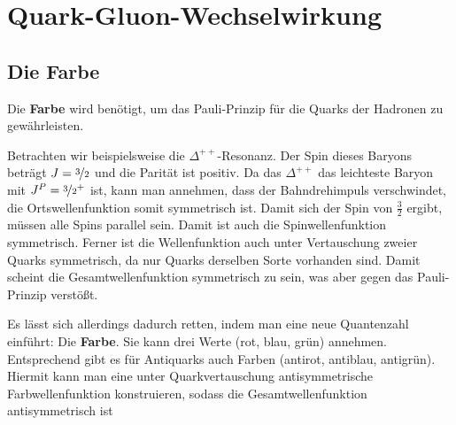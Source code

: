 \section{Quark-Gluon-Wechselwirkung}
\subsection{Die Farbe}
Die \textbf{Farbe} wird benötigt, um das Pauli-Prinzip für die Quarks der Hadronen zu gewährleisten.

Betrachten wir beispielsweise die $\Delta^{++}$-Resonanz.
Der Spin dieses Baryons beträgt $J=\nicefrac{3}{2}$ und die Parität ist positiv.
Da das $\Delta^{++}$ das leichteste Baryon mit $J^P=\nicefrac{3}{2}^+$ ist, kann man annehmen, dass der Bahndrehimpuls verschwindet, die Ortswellenfunktion somit symmetrisch ist.
Damit sich der Spin von $\tfrac{3}{2}$ ergibt, müssen alle Spins parallel sein.
Damit ist auch die Spinwellenfunktion symmetrisch.
Ferner ist die Wellenfunktion auch unter Vertauschung zweier Quarks symmetrisch, da nur Quarks derselben Sorte vorhanden sind.
Damit scheint die Gesamtwellenfunktion symmetrisch zu sein, was aber gegen das Pauli-Prinzip verstößt.

Es lässt sich allerdings dadurch retten, indem man eine neue Quantenzahl einführt: Die \textbf{Farbe}.
Sie kann drei Werte (rot, blau, grün) annehmen.
Entsprechend gibt es für Antiquarks auch Farben (antirot, antiblau, antigrün).
Hiermit kann man eine unter Quarkvertauschung antisymmetrische Farbwellenfunktion konstruieren, sodass die Gesamtwellenfunktion antisymmetrisch ist
